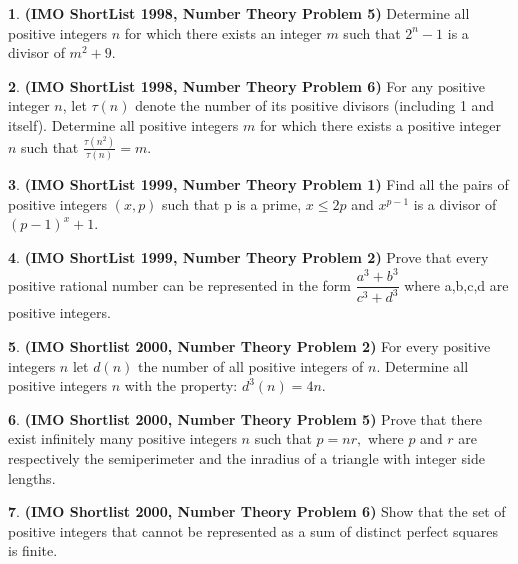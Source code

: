 \documentclass{article}
\newcommand{\equal}{=}
\theoremstyle{definition}
\newtheorem{p}{}
\begin{document}
\begin{p}{\bf (IMO ShortList 1998, Number Theory Problem 5)}
Determine all positive integers $n$ for which there exists an integer $m$ such that ${2^{n}-1}$ is a divisor of ${m^{2}+9}$.
\end{p}




\begin{p}{\bf (IMO ShortList 1998, Number Theory Problem 6)}
For any positive integer $n$, let $\tau (n)$ denote the number of its positive divisors (including 1 and itself). Determine all positive integers $m$ for which there exists a positive integer $n$ such that $\frac{\tau (n^{2})}{\tau (n)}=m$.
\end{p}







\begin{p}{\bf (IMO ShortList 1999, Number Theory Problem 1)}
Find all the pairs of positive integers $(x,p)$ such that p is a prime, $x \leq 2p$ and $x^{p-1}$ is a divisor of $ (p-1)^{x}+1$.
\end{p}



\begin{p}{\bf (IMO ShortList 1999, Number Theory Problem 2)}
Prove that every positive rational number can be represented in the form $\dfrac{a^{3}+b^{3}}{c^{3}+d^{3}}$ where a,b,c,d are positive integers.
\end{p}


\begin{p}{\bf (IMO Shortlist 2000, Number Theory Problem 2)}
For every positive integers $ n$ let $ d(n)$ the number of all positive integers of $ n$. Determine all positive integers $ n$ with the property: $ d^3(n) \equal{} 4n$.
\end{p}


\begin{p}{\bf (IMO Shortlist 2000, Number Theory Problem 5)}
Prove that there exist infinitely many positive integers $ n$ such that $ p \equal{} nr,$ where $ p$ and $ r$ are respectively the semiperimeter and the inradius of a triangle with integer side lengths.
\end{p}




\begin{p}{\bf (IMO Shortlist 2000, Number Theory Problem 6)}
Show that the set of positive integers that cannot be represented as a sum of distinct perfect squares is finite.
\end{p}
\end{document}
